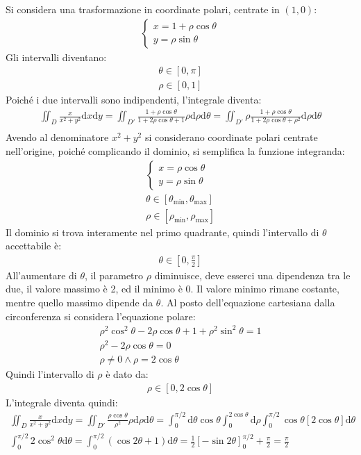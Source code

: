 \documentclass{article}
\newcommand{\df}{\mathrm{d}}
\numberwithin{equation}{subsection}
\begin{document}
Si considera una trasformazione in coordinate polari, centrate in $(1,0)$:
\begin{gather*}
    \begin{cases}
        x=1+\rho\cos\theta\\
        y=\rho\sin\theta
    \end{cases}
\end{gather*}
Gli intervalli diventano:
\begin{gather*}
    \theta\in[0,\pi]\\
    \rho\in[0,1]
\end{gather*}
Poiché i due intervalli sono indipendenti, l'integrale diventa:
\begin{gather*}
    \iint_D\frac{x}{x^2+y^2}\df x\df y=
    \iint_{D'}\frac{1+\rho\cos\theta}{1+2\rho\cos\theta+1}\rho\df\rho\df\theta=
    \iint_{D'}\rho\frac{1+\rho\cos\theta}{1+2\rho\cos\theta+\rho^2}\df\rho\df\theta\\
\end{gather*}
Avendo al denominatore $x^2+y^2$ si considerano coordinate polari centrate nell'origine, poiché complicando il dominio, si semplifica la funzione integranda:
\begin{gather*}
    \begin{cases}
        x=\rho\cos\theta\\
        y=\rho\sin\theta
    \end{cases}\\
    \theta\in[\theta_{\min},\theta_{\max}]\\
    \rho\in[\rho_{\min},\rho_{\max}]
\end{gather*}
Il dominio si trova interamente nel primo quadrante, quindi l'intervallo di $\theta$ accettabile è:
\begin{gather*}
    \theta\in\left[0,\frac{\pi}{2}\right]
\end{gather*}
All'aumentare di $\theta$, il parametro $\rho$ diminuisce, deve esserci una dipendenza tra le due, il valore massimo è 2, ed il minimo è 0. Il valore minimo rimane costante, mentre quello massimo dipende da $\theta$. Al posto dell'equazione cartesiana dalla circonferenza si considera l'equazione polare:
\begin{gather*}
    \rho^2\cos^2\theta-2\rho\cos\theta+1+\rho^2\sin^2\theta=1\\
    \rho^2-2\rho\cos\theta=0\\
    \rho\neq0\land\rho=2\cos\theta
\end{gather*}
Quindi l'intervallo di $\rho$ è dato da:
\begin{gather*}
    \rho\in[0,2\cos\theta]
\end{gather*}
L'integrale diventa quindi:
\begin{gather*}
    \iint_D\frac{x}{x^2+y^2}\df x\df y=
    \iint_{D'}\frac{\rho\cos\theta}{\rho^2}\rho\df\rho\df\theta=\int_0^{\pi/2}\df\theta\cos\theta\int_0^{2\cos\theta}\df\rho
    \int_0^{\pi/2}\cos\theta\left[2\cos\theta\right]\df\theta\\
    \int_0^{\pi/2}2\cos^2\theta\df\theta=\int_0^{\pi/2}(\cos2\theta+1)\df\theta=\frac{1}{2}\left[-\sin2\theta\right]_0^{\pi/2}+\frac{\pi}{2}=\frac{\pi}{2}
\end{gather*}
\end{document}
